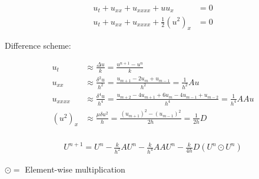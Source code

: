 
\begin{align*}
u_t + u_{xx} + u_{xxxx} + uu_x &= 0 \\
u_t + u_{xx} + u_{xxxx} + \frac{1}{2}(u^2)_x &= 0
\end{align*}

Difference scheme:

\LARGE
\begin{align*}
u_t &\approx \frac{\Delta u}{k} = \frac{u^{n+1}-u^n}{k} \\
u_{xx} &\approx \frac{\delta^2 u}{h^2} = \frac{u_{m+1}-2u_{m}+u_{m-1}}{h^2} = \frac{1}{h^2}Au \\
u_{xxxx} &\approx \frac{\delta^4 u}{h^4} = \frac{u_{m+2}-4u_{m+1}+6u_m-4u_{m-1}+u_{m-2}}{h^4} = \frac{1}{h^4}AAu\\
(u^2)_{x} &\approx \frac{\mu \delta u^2}{h} = \frac{(u_{m+1})^2-(u_{m-1})^2}{2h} = \frac{1}{2h}D\\
\end{align*}

\begin{align*}
U^{n+1} = U^n - \frac{k}{h^2}AU^n - \frac{k}{h^4}AAU^n - \frac{k}{4h}D(U^{n}\odot U^n)
\end{align*}

$\odot =$ Element-wise multiplication